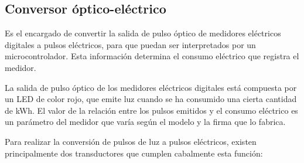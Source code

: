 \subsection{Conversor óptico-eléctrico}

Es el encargado de convertir la salida de pulso óptico de medidores eléctricos digitales a pulsos eléctricos, para que puedan ser interpretados por un microcontrolador. Esta información determina el consumo eléctrico que registra el medidor.

La salida de pulso óptico de los medidores eléctricos digitales está compuesta por un LED de color rojo, que emite luz cuando se ha consumido una cierta cantidad de kWh. El valor de la relación entre los pulsos emitidos y el consumo eléctrico es un parámetro del medidor que varía según el modelo y la firma que lo fabrica.

Para realizar la conversión de pulsos de luz a pulsos eléctricos, existen principalmente dos transductores que cumplen cabalmente esta función:

